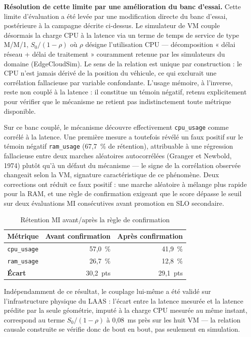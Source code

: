 \textbf{Résolution de cette limite par une amélioration du banc d'essai.} Cette limite d'évaluation a été levée par une modification directe du banc d'essai, postérieure à la campagne décrite ci-dessus. Le simulateur de VM couple désormais la charge CPU à la latence via un terme de temps de service de type M/M/1, $S_0/(1-\rho)$ où $\rho$ désigne l'utilisation CPU — décomposition « délai réseau + délai de traitement » couramment retenue par les simulateurs du domaine (EdgeCloudSim). Le sens de la relation est unique par construction : le CPU n'est jamais dérivé de la position du véhicule, ce qui exclurait une corrélation fallacieuse par variable confondante. L'usage mémoire, à l'inverse, reste non couplé à la latence : il constitue un témoin négatif, retenu explicitement pour vérifier que le mécanisme ne retient pas indistinctement toute métrique disponible.

Sur ce banc couplé, le mécanisme découvre effectivement \texttt{cpu\_usage} comme corrélé à la latence. Une première mesure a toutefois révélé un faux positif sur le témoin négatif \texttt{ram\_usage} (67,7~\% de rétention), attribuable à une régression fallacieuse entre deux marches aléatoires autocorrélées (Granger et Newbold, 1974) plutôt qu'à un défaut du mécanisme — le signe de la corrélation observée changeait selon la VM, signature caractéristique de ce phénomène. Deux corrections ont réduit ce faux positif : une marche aléatoire à mélange plus rapide pour la RAM, et une règle de confirmation exigeant que le score dépasse le seuil sur deux évaluations MI consécutives avant promotion en SLO secondaire.

\begin{table}[H]
    \centering
    \caption{Rétention MI avant/après la règle de confirmation}
    \label{tab:retention-mi-couplage}
    \begin{tabular}{lrr}
        \toprule
        \textbf{Métrique} & \textbf{Avant confirmation} & \textbf{Après confirmation} \\
        \midrule
        \texttt{cpu\_usage} & 57,0~\% & 41,9~\% \\
        \texttt{ram\_usage} & 26,7~\% & 12,8~\% \\
        \midrule
        \textbf{Écart} & 30,2~pts & 29,1~pts \\
        \bottomrule
    \end{tabular}
\end{table}

Indépendamment de ce résultat, le couplage lui-même a été validé sur l'infrastructure physique du LAAS : l'écart entre la latence mesurée et la latence prédite par la seule géométrie, imputé à la charge CPU mesurée au même instant, correspond au terme $S_0/(1-\rho)$ à 0,08~ms près sur les huit VM — la relation causale construite se vérifie donc de bout en bout, pas seulement en simulation.

